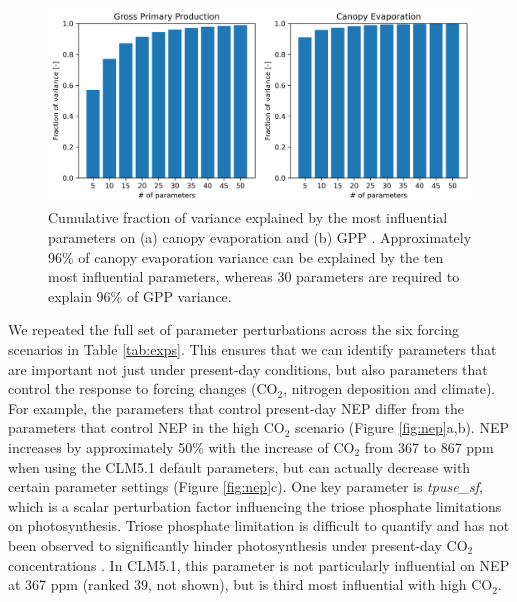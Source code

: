 \documentclass[draft]{agujournal2019}
\begin{document}
\begin{figure}[h]
\centering
\includegraphics[width=\textwidth]{../figs/variance.png}
\caption{Cumulative fraction of variance explained by the most influential parameters on (a) canopy evaporation and (b) GPP . Approximately 96\% of canopy evaporation variance can be explained by the ten most influential parameters, whereas 30 parameters are required to explain 96\% of GPP variance.}
\label{fig:variance}
\end{figure}

We repeated the full set of parameter perturbations across the six forcing scenarios in Table \ref{tab:exps}. This ensures that we can identify parameters that are important not just under present-day conditions, but also parameters that control the response to forcing changes (CO$_2$, nitrogen deposition and climate). For example, the parameters that control present-day NEP differ  from the parameters that control NEP in the high CO$_2$ scenario (Figure \ref{fig:nep}a,b). NEP increases by approximately 50\% with the increase of CO$_2$ from 367 to 867 ppm when using the CLM5.1 default parameters, but can actually decrease with certain parameter settings (Figure \ref{fig:nep}c). One key parameter is \textit{tpuse\_sf}, which is a scalar perturbation factor influencing the triose phosphate limitations on photosynthesis. Triose phosphate limitation is difficult to quantify and has not been observed to significantly hinder photosynthesis under present-day CO$_2$ concentrations \cite{kumarathunge2019}. In CLM5.1, this parameter is not particularly influential on NEP at 367 ppm (ranked 39, not shown), but is third most influential with high CO$_2$. 
\end{document}
